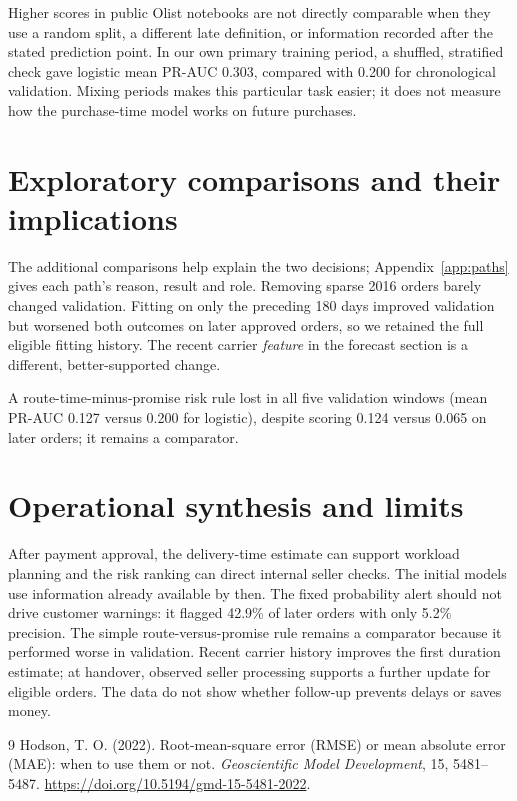 \documentclass[12pt,a4paper]{article}
\begin{document}
Higher scores in public Olist notebooks are not directly comparable when they use a random split, a different late definition, or information recorded after the stated prediction point. In our own primary training period, a shuffled, stratified check gave logistic mean PR-AUC 0.303, compared with 0.200 for chronological validation. Mixing periods makes this particular task easier; it does not measure how the purchase-time model works on future purchases.

\section*{Exploratory comparisons and their implications}
The additional comparisons help explain the two decisions; Appendix~\ref{app:paths} gives each path's reason, result and role. Removing sparse 2016 orders barely changed validation. Fitting on only the preceding 180 days improved validation but worsened both outcomes on later approved orders, so we retained the full eligible fitting history. The recent carrier \emph{feature} in the forecast section is a different, better-supported change.

A route-time-minus-promise risk rule lost in all five validation windows (mean PR-AUC 0.127 versus 0.200 for logistic), despite scoring 0.124 versus 0.065 on later orders; it remains a comparator.

\clearpage
\section*{Operational synthesis and limits}
After payment approval, the delivery-time estimate can support workload planning and the risk ranking can direct internal seller checks. The initial models use information already available by then. The fixed probability alert should not drive customer warnings: it flagged 42.9\% of later orders with only 5.2\% precision. The simple route-versus-promise rule remains a comparator because it performed worse in validation. Recent carrier history improves the first duration estimate; at handover, observed seller processing supports a further update for eligible orders. The data do not show whether follow-up prevents delays or saves money.

\begin{thebibliography}{9}\setlength{\itemsep}{0pt}
 Hodson, T. O. (2022). Root-mean-square error (RMSE) or mean absolute error (MAE): when to use them or not. \emph{Geoscientific Model Development}, 15, 5481--5487. \url{https://doi.org/10.5194/gmd-15-5481-2022}.
\end{thebibliography}
\end{document}
